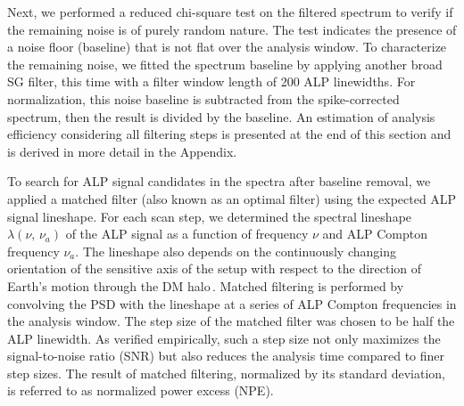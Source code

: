 \documentclass[superscriptaddress,
floatfix,
reprint,
nofootinbib,
amsmath,amssymb,
aps,
prd,
]{revtex4-2}
\begin{document}
Next, we performed a reduced chi-square test on the filtered spectrum to verify if the remaining noise is of purely random nature.
The test indicates the presence of a noise floor (baseline) that is not flat over the analysis window. 
To characterize the remaining noise, we fitted the spectrum baseline by applying another broad SG filter, this time with a filter window length of 200 ALP linewidths.
For normalization, this noise baseline is subtracted from the spike-corrected spectrum, then the result is divided by the baseline. 
An estimation of analysis efficiency considering all filtering steps is presented at the end of this section and is derived in more detail in the Appendix.

To search for ALP signal candidates in the spectra after baseline removal, we applied a matched filter (also known as an optimal filter) using the expected ALP signal lineshape. 
For each scan step, we determined the spectral lineshape $\lambda(\nu,\,\nu_a)$ of the ALP signal as a function of frequency $\nu$ and ALP Compton frequency $\nu_a$.
The lineshape also depends on the continuously changing orientation of the sensitive axis of the setup with respect to the direction of Earth's motion through the DM halo\,\cite{Gramolin2022Feb_SpectralSignatures}.
Matched filtering is performed by convolving the PSD with the lineshape at a series of ALP Compton frequencies in the analysis window. 
The step size of the matched filter was chosen to be half the ALP linewidth. 
As verified empirically, such a step size not only maximizes the signal-to-noise ratio (SNR) but also reduces the analysis time compared to finer step sizes.
The result of matched filtering, normalized by its standard deviation, is referred to as normalized power excess (NPE).
\end{document}
